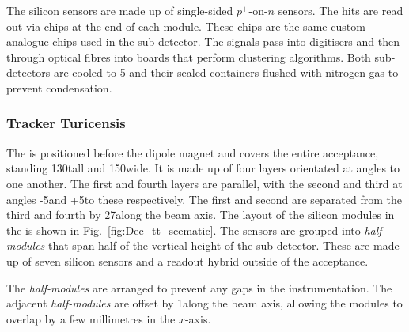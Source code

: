 The silicon sensors are made up of single-sided $p^{+}$-on-$n$ sensors. The hits are read out via chips at the end of each module. These chips are the same custom analogue chips used in the \velo sub-detector. The signals pass into digitisers and then through optical fibres into \tellone boards that perform clustering algorithms.
Both sub-detectors are cooled to 5 and their sealed containers flushed with nitrogen gas to prevent condensation.



\subsubsection{Tracker Turicensis}

The \ttracker is positioned before the dipole magnet and covers the entire \lhcb acceptance, standing 130\cm tall and 150\cm wide.
It is made up of four layers orientated at angles to one another. The first and fourth layers are parallel, with the second and third at angles -5\degrees and +5\degrees to these respectively. The first and second are separated from the third and fourth by 27\cm along the beam axis. The layout of the silicon modules in the \ttracker is shown in Fig.~\ref{fig:Dec_tt_scematic}. The sensors are grouped into \emph{half-modules} that span half of the vertical height of the sub-detector. These are made up of seven silicon sensors and a readout hybrid outside of the \lhcb acceptance.

The \emph{half-modules} are arranged to prevent any gaps in the instrumentation. The adjacent \emph{half-modules} are offset by 1\cm along the beam axis, allowing the modules to overlap by a few millimetres in the $x$-axis. 


